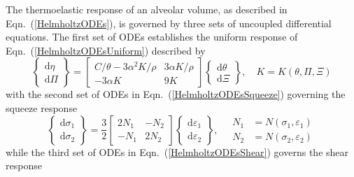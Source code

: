 The thermo\-elastic response of an alveolar volume, as described in Eqn.~(\ref{HelmholtzODEs}), is governed by three sets of uncoupled differential equations.  The first set of ODEs establishes the uniform response of Eqn.~(\ref{HelmholtzODEsUniform}) described by
\begin{displaymath}
\left\{ \begin{matrix}
\mathrm{d} \eta \\ \mathrm{d} \Pi 
\end{matrix} \right\} = \begin{bmatrix}
C / \theta - 3 \alpha^2 K / \rho & 3 \alpha K / \rho \\
-3 \alpha K & 9K
\end{bmatrix} \left\{ \begin{matrix}
\mathrm{d} \theta \\ \mathrm{d} \Xi 
\end{matrix} \right\} , \quad
K = K ( \theta , \Pi , \Xi )
\end{displaymath}
with the second set of ODEs in Eqn.~(\ref{HelmholtzODEsSqueeze}) governing the squeeze response
\begin{displaymath}
\left\{ \begin{matrix}
\mathrm{d} \sigma_1 \\ \mathrm{d} \sigma_2
\end{matrix} \right\} = \frac{3}{2} \begin{bmatrix}
2 N_1 & -N_2 \\
-N_1 & 2N_2
\end{bmatrix} \left\{ \begin{matrix}
\mathrm{d} \varepsilon_1 \\ \mathrm{d} \varepsilon_2
\end{matrix} \right\} , \quad
\begin{aligned}
N_1 & = N ( \sigma_1 , \varepsilon_1 ) \\
N_2 & = N ( \sigma_2 , \varepsilon_2 )
\end{aligned}
\end{displaymath}
while the third set of ODEs in Eqn.~(\ref{HelmholtzODEsShear}) governs the shear response

